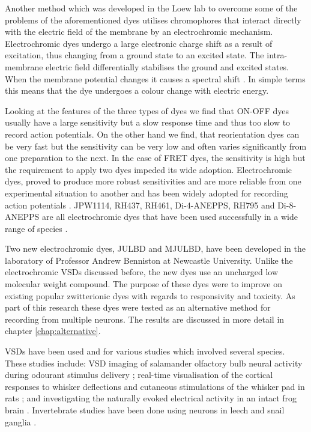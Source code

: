 Another method which was developed in the Loew lab to overcome some of the problems of the aforementioned dyes utilises chromophores that interact directly with the electric field of the membrane by an electrochromic mechanism. Electrochromic dyes undergo a large electronic charge shift as a result of excitation, thus changing from a ground state to an excited state. The intra-membrane electric field differentially stabilises the ground and excited states. When the membrane potential changes it causes a spectral shift \cite{Loew1996}. In simple terms this means that the dye undergoes a colour change with electric energy.

Looking at the features of the three types of dyes we find that ON-OFF dyes usually have a large sensitivity but a slow response time and thus too slow to record action potentials. On the other hand we find, that reorientation dyes can be very fast but the sensitivity can be very low and often varies significantly from one preparation to the next. In the case of \ac{FRET} dyes, the sensitivity is high but the requirement to apply two dyes impeded its wide adoption. Electrochromic dyes, proved to produce more robust sensitivities and are more reliable from one experimental situation to another and has been widely adopted for recording action potentials \cite{Loew2011}. JPW1114, RH437, RH461, Di-4-ANEPPS, RH795 and Di-8-ANEPPS are all electrochromic dyes that have been used successfully in a wide range of species \cite{Antic1995, Chemla2010, Preuss2013}.

Two new electrochromic dyes, JULBD and MJULBD, have been developed in the laboratory of Professor Andrew Benniston at Newcastle University. Unlike the electrochromic \acp{VSD} discussed before, the new dyes use an uncharged low molecular weight compound. The purpose of these dyes were to improve on existing popular zwitterionic dyes with regards to responsivity and toxicity. As part of this research these dyes were tested as an alternative method for recording from multiple neurons. The results are discussed in more detail in chapter \ref{chap:alternative}. 

\Acp{VSD} have been used  and  for various studies which involved several species. These studies include:  \ac{VSD} imaging of salamander olfactory bulb neural activity during odourant stimulus delivery \cite{Cinelli1995}; real-time visualisation of the cortical responses to whisker deflections and cutaneous stimulations of the whisker pad in rats \cite{Derdikman2003}; and investigating the naturally evoked electrical activity in an intact frog brain \cite{Grinvald1984}. Invertebrate studies have been done using neurons in leech  \cite{Briggman2010} and snail ganglia \cite{Hill2012, Bruno2015}.

